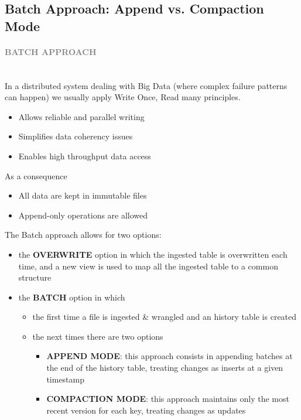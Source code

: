 \documentclass[10pt,a4paper]{article}
\newcommand{\myparagraph}[1]{\paragraph{\normalsize{\textcolor{gray}{\uppercase{\textbf{#1}}}} }\mbox{} \vspace{0.5em}\\}
\begin{document}
 \subsection{Batch Approach: Append vs. Compaction Mode}
 \myparagraph{Batch Approach}
 In a distributed system dealing with Big Data (where complex failure patterns can happen) we usually apply Write Once, Read many principles.
 \begin{itemize}
 	\item Allows reliable and parallel writing
 	\item Simplifies data coherency issues
 	\item Enables high throughput data access

 \end{itemize}
 As a consequence
\begin{itemize}
	\item All data are kept in immutable files
	\item Append-only operations are allowed
\end{itemize}
The Batch approach allows for two options:
\begin{itemize}
	\item the \textbf{OVERWRITE} option in which the ingested table is overwritten each time, and a new view is used to map all the ingested table to a common structure
	\item the \textbf{BATCH} option in which 
	\begin{itemize}
	\item the first time a file is ingested \& wrangled and an history table is created
	\item the next times there are two options
	\begin{itemize}
			\item \textbf{APPEND MODE}: this approach consists in appending batches at the end of the history table, treating changes as inserts at a given timestamp
		\item \textbf{COMPACTION MODE}: this approach maintains only the most recent version for each key, treating changes as updates
		\end{itemize}
\end{itemize}
\end{itemize}
\end{document}
